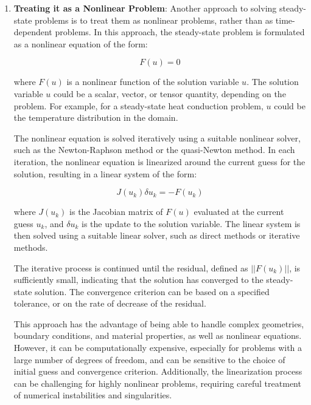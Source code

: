 \begin{enumerate}
  \item \textbf{Treating it as a Nonlinear Problem}:  Another approach to solving steady-state problems is to treat them as nonlinear problems, rather than as time-dependent problems. In this approach, the steady-state problem is formulated as a nonlinear equation of the form:

        \begin{equation}
          F(u) = 0
        \end{equation}

        where $F(u)$ is a nonlinear function of the solution variable $u$. The solution variable $u$ could be a scalar, vector, or tensor quantity, depending on the problem. For example, for a steady-state heat conduction problem, $u$ could be the temperature distribution in the domain.

        The nonlinear equation is solved iteratively using a suitable nonlinear solver, such as the Newton-Raphson method or the quasi-Newton method. In each iteration, the nonlinear equation is linearized around the current guess for the solution, resulting in a linear system of the form:

        \begin{equation}
          J(u_k) \delta u_k = -F(u_k)
        \end{equation}

        where $J(u_k)$ is the Jacobian matrix of $F(u)$ evaluated at the current guess $u_k$, and $\delta u_k$ is the update to the solution variable. The linear system is then solved using a suitable linear solver, such as direct methods or iterative methods.

        The iterative process is continued until the residual, defined as $||F(u_k)||$, is sufficiently small, indicating that the solution has converged to the steady-state solution. The convergence criterion can be based on a specified tolerance, or on the rate of decrease of the residual.

        This approach has the advantage of being able to handle complex geometries, boundary conditions, and material properties, as well as nonlinear equations. However, it can be computationally expensive, especially for problems with a large number of degrees of freedom, and can be sensitive to the choice of initial guess and convergence criterion. Additionally, the linearization process can be challenging for highly nonlinear problems, requiring careful treatment of numerical instabilities and singularities.


\end{enumerate}
